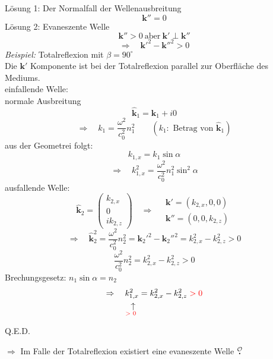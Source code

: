 \documentclass[titlepage,11pt,a4paper,ngerman]{report}
\newcommand{\tx}[1]{\textrm{#1}}
\newcommand{\custo}[3]{\underset{\scriptstyle\overset{\mkern4mu\rotatebox{-90}{$\,#1$}}{#3}}{#2}}
\renewcommand{\vec}[1]{\boldsymbol{#1}}
\newcommand{\lcom}[1]{\color{MidnightBlue}#1\color{black}}
\newcommand{\mau}{$\buildrel \mathcal{O} \over{\textbf{.}}$}
\begin{document}
Lösung 1: Der Normalfall der Wellenausbreitung
\begin{equation*}
\vec{k}'' = 0
\end{equation*}
Lösung 2: Evaneszente Welle
\begin{equation*}
\vec{k}'' > 0 \ \tx{aber} \ \vec{k}' \perp \vec{k}''
\end{equation*}
\begin{equation*}
\Rightarrow \quad \vec{k}'^2 - \vec{k}''^2 > 0
\end{equation*}
\emph{Beispiel:} Totalreflexion mit $ \beta = 90 ^\circ $\\
\lcom{Die $ \vec{k}' $ Komponente ist bei der Totalreflexion parallel zur Oberfläche des Mediums.}\\[5pt]
einfallende Welle:\\
normale Ausbreitung
\begin{equation*}
\hat{\vec{k}}_1 = \vec{k}_1 + i 0
\end{equation*}
\begin{equation*}
\Rightarrow \quad k_1 = \frac{\omega^2}{c_0^2} n_1^2 \qquad (k_1: \tx{ Betrag von } \hat{\vec{k}}_1)
\end{equation*}
aus der Geometrei folgt:
\begin{equation*}
k_{1,x} = k_1 \sin\alpha
\end{equation*}
\begin{equation*}
\Rightarrow \quad k_{1,x}^2 = \frac{\omega^2}{c_0^2} n_1^2 \sin^2 \alpha
\end{equation*}
ausfallende Welle:
\begin{equation*}
\hat{\vec{k}}_2 = \begin{pmatrix}
k_{2,x} \\ 0 \\ i k_{2,z}
\end{pmatrix} \quad \Rightarrow \quad \begin{array}{c}
\vec{k}' = (k_{2,x} , 0 , 0) \\ \vec{k}'' = (0 , 0 , k_{2,z})
\end{array}
\end{equation*}
\begin{equation*}
\Rightarrow \quad \hat{\vec{k}}_2^2 = \frac{\omega^2}{c_0^2} n_2^2 = \vec{k}_2'^2 - \vec{k}_2''^2 = k_{2,x}^2 - k_{2,z}^2 > 0
\end{equation*}
\begin{equation*}
\frac{\omega^2}{c_0^2} n_2^2 = k_{2,x}^2 - k_{2,z}^2 > 0
\end{equation*}
Brechungsgesetz: $ n_1 \sin\alpha = n_2 $
\begin{equation*}
\Rightarrow \quad \custo{\leftarrow}{k_{1,x}^2}{\tx{\color{red} > 0 \color{black}}} = k_{2,x}^2 - k_{2,z}^2 \color{red} >0 \color{black}
\end{equation*}
\begin{flushright}
	\vspace{-20pt}
	\color{red} Q.E.D. \color{black}
\end{flushright}
$ \Rightarrow $ Im Falle der Totalreflexion existiert eine evaneszente Welle \mau
\end{document}
